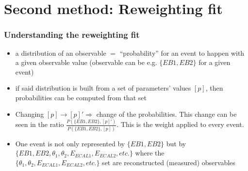 \documentclass{beamer}
\begin{document}
\section{Second method: Reweighting fit}
\begin{frame}
\frametitle{Understanding the reweighting fit}
\begin{itemize}
  \item a \alert{distribution} of an observable $=$ \alert{``probability''} for
  an event to happen with a given observable value (observable can be e.g. $\{EB1,EB2\}$ for
  a given event)%
  \item if said distribution is built from a set of parameters' values
  $[p]$, then probabilities can be computed from that set
  \item Changing $[p]\to [p]'\Rightarrow$ change of the probabilities. This
  change can be seen in the ratio $\frac{P(\{EB1,EB2\},
  [p]')}{P(\{EB1,EB2\},[p])}$. This is the weight applied to every event.
  \item One event is not only represented by $\{EB1,EB2\}$ but by
  $\{EB1,EB2,\theta_1,\theta_2,E_{ECAL1},E_{ECAL2},etc.\}$ where the
  $\{\theta_1,\theta_2,E_{ECAL1},E_{ECAL2},etc.\}$ set are reconstructed
  (measured) observables
\end{itemize}
\end{frame}
\end{document}
